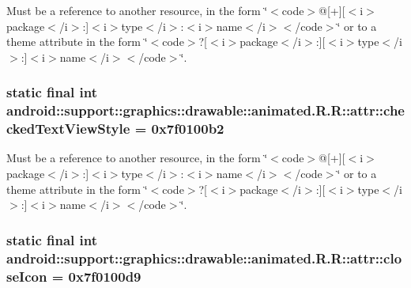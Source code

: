 Must be a reference to another resource, in the form \char`\"{}$<$code$>$@\mbox{[}+\mbox{]}\mbox{[}$<$i$>$package$<$/i$>$:\mbox{]}$<$i$>$type$<$/i$>$:$<$i$>$name$<$/i$>$$<$/code$>$\char`\"{} or to a theme attribute in the form \char`\"{}$<$code$>$?\mbox{[}$<$i$>$package$<$/i$>$:\mbox{]}\mbox{[}$<$i$>$type$<$/i$>$:\mbox{]}$<$i$>$name$<$/i$>$$<$/code$>$\char`\"{}. \hypertarget{classandroid_1_1support_1_1graphics_1_1drawable_1_1animated_1_1_r_1_1attr_8985e38c901933d5122e5746ebdd8eab}{
\subsubsection[{checkedTextViewStyle}]{\setlength{\rightskip}{0pt plus 5cm}static final int android::support::graphics::drawable::animated.R.R::attr::checkedTextViewStyle = 0x7f0100b2}}
\label{classandroid_1_1support_1_1graphics_1_1drawable_1_1animated_1_1_r_1_1attr_8985e38c901933d5122e5746ebdd8eab}


Must be a reference to another resource, in the form \char`\"{}$<$code$>$@\mbox{[}+\mbox{]}\mbox{[}$<$i$>$package$<$/i$>$:\mbox{]}$<$i$>$type$<$/i$>$:$<$i$>$name$<$/i$>$$<$/code$>$\char`\"{} or to a theme attribute in the form \char`\"{}$<$code$>$?\mbox{[}$<$i$>$package$<$/i$>$:\mbox{]}\mbox{[}$<$i$>$type$<$/i$>$:\mbox{]}$<$i$>$name$<$/i$>$$<$/code$>$\char`\"{}. \hypertarget{classandroid_1_1support_1_1graphics_1_1drawable_1_1animated_1_1_r_1_1attr_89877f1bac7cb71016b8d2861f01842d}{
\subsubsection[{closeIcon}]{\setlength{\rightskip}{0pt plus 5cm}static final int android::support::graphics::drawable::animated.R.R::attr::closeIcon = 0x7f0100d9}}
\label{classandroid_1_1support_1_1graphics_1_1drawable_1_1animated_1_1_r_1_1attr_89877f1bac7cb71016b8d2861f01842d}


